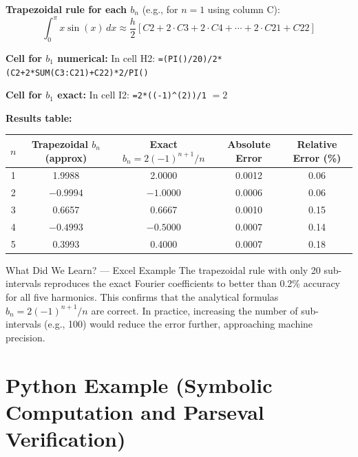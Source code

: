 \documentclass[12pt,a4paper]{article}
\begin{document}
\textbf{Trapezoidal rule for each $b_n$} (e.g., for $n=1$ using column C):
\[
  \int_0^{\pi} x\sin(x)\,dx \approx \frac{h}{2}\left[C2 + 2\cdot C3 + 2\cdot C4 + \cdots + 2\cdot C21 + C22\right]
\]

\textbf{Cell for $b_1$ numerical:} In cell H2:
\texttt{=(PI()/20)/2*(C2+2*SUM(C3:C21)+C22)*2/PI()}

\textbf{Cell for $b_1$ exact:} In cell I2:
\texttt{=2*((-1)^(2))/1} $= 2$

\vspace{0.5em}
\textbf{Results table:}

\begin{center}
\begin{tabular}{ccccc}
\toprule
$n$ & Trapezoidal $b_n$ (approx) & Exact $b_n = 2(-1)^{n+1}/n$ & Absolute Error & Relative Error (\%) \\
\midrule
1 & 1.9988 & 2.0000 & 0.0012 & 0.06 \\
2 & $-0.9994$ & $-1.0000$ & 0.0006 & 0.06 \\
3 & 0.6657 & 0.6667 & 0.0010 & 0.15 \\
4 & $-0.4993$ & $-0.5000$ & 0.0007 & 0.14 \\
5 & 0.3993 & 0.4000 & 0.0007 & 0.18 \\
\bottomrule
\end{tabular}
\end{center}

\begin{learnbox}{What Did We Learn? --- Excel Example}
The trapezoidal rule with only 20 sub-intervals reproduces the exact Fourier coefficients to better than 0.2\% accuracy for all five harmonics. This confirms that the analytical formulas $b_n = 2(-1)^{n+1}/n$ are correct. In practice, increasing the number of sub-intervals (e.g., 100) would reduce the error further, approaching machine precision.
\end{learnbox}

\section{Python Example (Symbolic Computation and Parseval Verification)}
\end{document}
